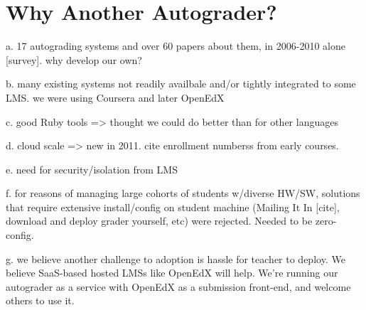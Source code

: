 \section{Why Another Autograder?}



a.	17 autograding systems and over 60  papers  about them, in 2006-2010 alone [survey]. why develop our own? 

b.	many existing systems not readily availbale and/or tightly integrated to some LMS. we were using Coursera and later OpenEdX

c.	good Ruby tools => thought we could do better than for other languages

d.	cloud scale => new in 2011. cite enrollment numberss from early courses.

e.	need for security/isolation from LMS

f.	for reasons of managing large cohorts of students w/diverse HW/SW, solutions that require extensive install/config on student machine (Mailing It In [cite], download and deploy grader yourself, etc) were rejected. Needed to be zero-config.

g.	we believe another challenge to adoption is hassle for teacher to deploy. We believe SaaS-based hosted LMSs like OpenEdX will help. We're running our autograder as a service with OpenEdX as a submission front-end, and welcome others to use it.



